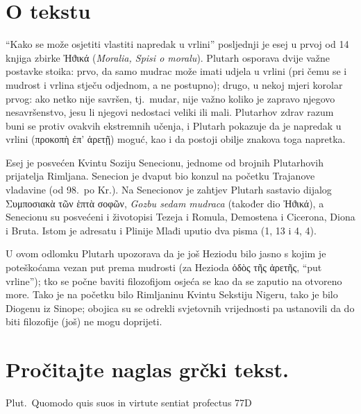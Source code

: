 
\section*{O tekstu}

``Kako se može osjetiti vlastiti napredak u vrlini'' posljednji je esej u prvoj od 14 knjiga zbirke \textgreek[variant=ancient]{Ἠϑικά} (\textit{Moralia, Spisi o moralu}). Plutarh osporava dvije važne postavke stoika: prvo, da samo mudrac može imati udjela u vrlini (pri čemu se i mudrost i vrlina stječu odjednom, a ne postupno); drugo, u nekoj mjeri korolar prvog: ako netko nije savršen, tj.\ mudar, nije važno koliko je zapravo njegovo nesavršenstvo, jesu li njegovi nedostaci veliki ili mali. Plutarhov zdrav razum buni se protiv ovakvih ekstremnih učenja, i Plutarh pokazuje da je napredak u vrlini \textgreek[variant=ancient]{(προκοπὴ ἐπ' ἀρετῇ)} moguć, kao i da postoji obilje znakova toga napretka.

Esej je posvećen Kvintu Soziju Senecionu, jednome od brojnih Plutarhovih prijatelja Rimljana. Senecion je dvaput bio konzul na početku Trajanove vladavine (od 98.\ po Kr.). Na Senecionov je zahtjev Plutarh sastavio dijalog \textgreek[variant=ancient]{Συμποσιακὰ τῶν ἑπτὰ σοφῶν,} \textit{Gozbu sedam mudraca} (također dio \textgreek[variant=ancient]{Ἠϑικά}), a Senecionu su posvećeni i životopisi Tezeja i Romula, Demostena i Cicerona, Diona i Bruta. Istom je adresatu i Plinije Mlađi uputio dva pisma (1, 13 i 4, 4).

U ovom odlomku Plutarh upozorava da je još Heziodu bilo jasno s kojim je poteškoćama vezan put prema mudrosti (za Hezioda ὁδὸς τῆς ἀρετῆς, ``put vrline''); tko se počne baviti filozofijom osjeća se kao da se zaputio na otvoreno more. Tako je na početku bilo Rimljaninu Kvintu Sekstiju Nigeru, tako je bilo Diogenu iz Sinope; obojica su se odrekli svjetovnih vrijednosti pa ustanovili da do biti filozofije (još) ne mogu doprijeti.


\section*{Pročitajte naglas grčki tekst.}

Plut.\ Quomodo quis suos in virtute sentiat profectus 77D


\medskip


